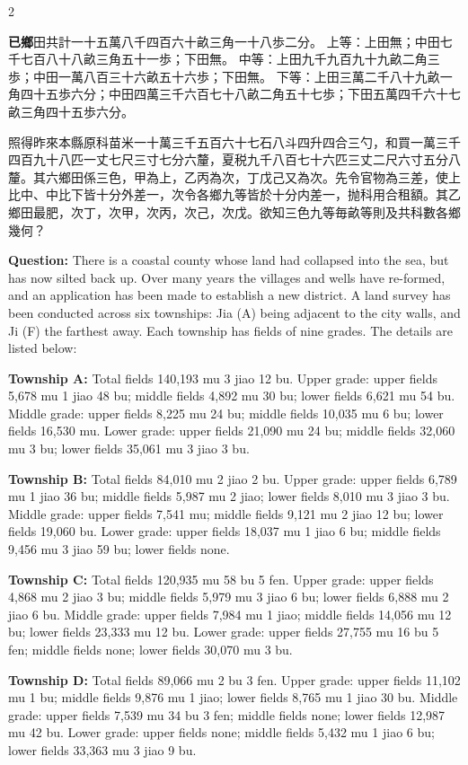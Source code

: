 \documentclass[11pt,a4paper]{article}
\newcommand{\QuestionEn}[1]{\par\noindent\textbf{\color{problemcolor}Question:} #1\par}
\begin{document}
\begin{paracol}{2}
{\textbf{已鄉}田共計一十五萬八千四百六十畝三角一十八歩二分。
上等：上田無；中田七千七百八十八畝三角五十一歩；下田無。
中等：上田九千九百九十九畝二角三歩；中田一萬八百三十六畝五十六歩；下田無。
下等：上田三萬二千八十九畝一角四十五歩六分；中田四萬三千六百七十八畝二角五十七歩；下田五萬四千六十七畝三角四十五歩六分。

照得昨來本縣原科苗米一十萬三千五百六十七石八斗四升四合三勺，和買一萬三千四百九十八匹一丈七尺三寸七分六釐，夏税九千八百七十六匹三丈二尺六寸五分八釐。其六鄉田係三色，甲為上，乙丙為次，丁戊己又為次。先令官物為三差，使上比中、中比下皆十分外差一，次令各鄉九等皆於十分内差一，抛科用合租額。其乙鄉田最肥，次丁，次甲，次丙，次己，次戊。欲知三色九等毎畝等則及共科數各鄉幾何？}

\switchcolumn

\QuestionEn{There is a coastal county whose land had collapsed into the sea, but has now silted back up. Over many years the villages and wells have re-formed, and an application has been made to establish a new district. A land survey has been conducted across six townships: Jia (A) being adjacent to the city walls, and Ji (F) the farthest away. Each township has fields of nine grades. The details are listed below:

\textbf{Township A:} Total fields 140,193 mu 3 jiao 12 bu. Upper grade: upper fields 5,678 mu 1 jiao 48 bu; middle fields 4,892 mu 30 bu; lower fields 6,621 mu 54 bu. Middle grade: upper fields 8,225 mu 24 bu; middle fields 10,035 mu 6 bu; lower fields 16,530 mu. Lower grade: upper fields 21,090 mu 24 bu; middle fields 32,060 mu 3 bu; lower fields 35,061 mu 3 jiao 3 bu.

\textbf{Township B:} Total fields 84,010 mu 2 jiao 2 bu. Upper grade: upper fields 6,789 mu 1 jiao 36 bu; middle fields 5,987 mu 2 jiao; lower fields 8,010 mu 3 jiao 3 bu. Middle grade: upper fields 7,541 mu; middle fields 9,121 mu 2 jiao 12 bu; lower fields 19,060 bu. Lower grade: upper fields 18,037 mu 1 jiao 6 bu; middle fields 9,456 mu 3 jiao 59 bu; lower fields none.

\textbf{Township C:} Total fields 120,935 mu 58 bu 5 fen. Upper grade: upper fields 4,868 mu 2 jiao 3 bu; middle fields 5,979 mu 3 jiao 6 bu; lower fields 6,888 mu 2 jiao 6 bu. Middle grade: upper fields 7,984 mu 1 jiao; middle fields 14,056 mu 12 bu; lower fields 23,333 mu 12 bu. Lower grade: upper fields 27,755 mu 16 bu 5 fen; middle fields none; lower fields 30,070 mu 3 bu.

\textbf{Township D:} Total fields 89,066 mu 2 bu 3 fen. Upper grade: upper fields 11,102 mu 1 bu; middle fields 9,876 mu 1 jiao; lower fields 8,765 mu 1 jiao 30 bu. Middle grade: upper fields 7,539 mu 34 bu 3 fen; middle fields none; lower fields 12,987 mu 42 bu. Lower grade: upper fields none; middle fields 5,432 mu 1 jiao 6 bu; lower fields 33,363 mu 3 jiao 9 bu.

}
\end{paracol}
\end{document}
